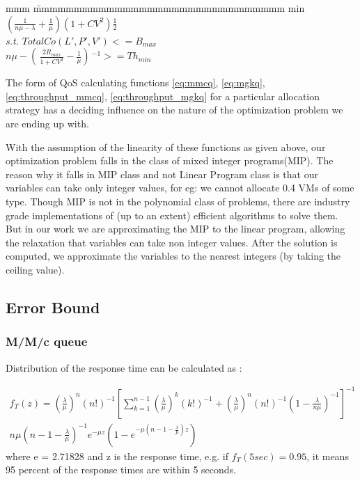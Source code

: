 \begin{tabbing}
mmm  \=mmmmmmmmmmmmmmmmmmmmmmmmmmmmmmm \kill
min \> $( \frac{ 1 }{n \mu - \lambda}+\frac{1}{\mu} ) ( 1+CV^2 ) \frac{1}{2}$ \\
{\it s.t.}  \> $TotalCo(L\prime,P\prime,V\prime) <= B_{max}$ \\
            \> $n \mu - ( \, \frac{ 2 R_{max} }{1+CV^2} - \frac{1}{\mu} ) \,^{-1} >= Th_{min}$  
\end{tabbing}


The form of QoS calculating functions \eqref{eq:mmcq}, \eqref{eq:mgkq}, \eqref{eq:throughput_mmcq}, \eqref{eq:throughput_mgkq} for a particular allocation strategy has a deciding influence on the nature of the optimization problem we are ending up with. 
            
With the assumption of the linearity of these functions as given above, our optimization problem falls in the class of mixed integer programs(MIP). The reason why it falls in MIP class and not Linear Program class is that our variables can take only integer values, for eg: we cannot allocate 0.4 VMs of some type. Though MIP is not in the polynomial class of problems, there are industry grade implementations of (up to an extent) efficient algorithms to solve them. But in our work we are approximating the MIP to the linear program, allowing the relaxation that variables can take non integer values. After the solution is computed, we approximate the variables to the nearest integers (by taking the ceiling value).



\subsection{Error Bound}



\subsubsection{M/M/c queue}

Distribution of the response time can be calculated as \cite{sztrik2011basic}:

\begin{multline}\label{eq:distribution_mmcq}
f_T(z) = ( \frac{\lambda}{\mu} )^n (n!)^{-1} [ \sum_{k=1}^{n-1} (\frac{\lambda}{\mu})^k (k!)^{-1} + ( \frac{\lambda}{\mu} )^n (n!)^{-1} (1 - \frac{\lambda}{n\mu})^{-1} ]^{-1} \\ 
n\mu (n-1- \frac{\lambda}{\mu} )^{-1} e^{-\mu z} ( 1 - e^{-\mu( n - 1 - \frac{\lambda}{\mu} )z} ) 
\end{multline}
where e = 2.71828 and z is the response time, e.g. if $f_T ( 5 sec ) = 0.95$, it means 95 percent of  the response times are within 5 seconds.



